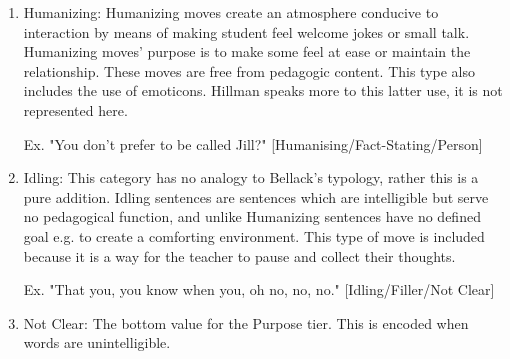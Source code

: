 \documentclass[10pt, letterpaper]{article}
\begin{document}
\begin{enumerate}
\item Humanizing: Humanizing moves create an atmosphere conducive to interaction
by means of making student feel welcome jokes or small talk. Humanizing
moves' purpose is to make some feel at ease or maintain the relationship.
These moves are free from pedagogic content. This type also includes the
use of emoticons. Hillman speaks more to this latter use, it is not
represented here.

Ex. "You don't prefer to be called Jill?" [Humanising/Fact-Stating/Person]

\item Idling: This category has no analogy to Bellack's typology, rather this is
a pure addition. Idling sentences are sentences which are intelligible but
serve no pedagogical function, and unlike Humanizing sentences have no
defined goal e.g. to create a comforting environment. This type of move is
included because it is a way for the teacher to pause and collect their
thoughts.

Ex. "That you, you know when you, oh no, no, no." [Idling/Filler/Not Clear]

\item Not Clear: The bottom value for the Purpose tier. This is encoded when
words are unintelligible.
\end{enumerate}
\end{document}

